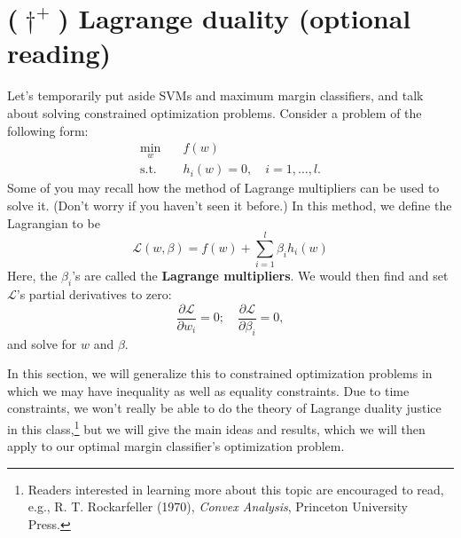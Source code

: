 \section{($\dagger^+$) Lagrange duality (optional reading)}
Let's temporarily put aside SVMs and maximum margin classifiers, and talk
about solving constrained optimization problems.
Consider a problem of the following form:
\begin{align*} %
    \min_w \quad& f(w)\\
    \operatorname{s.t.} \quad& h_i (w) = 0, \quad i = 1,\ldots,l.    
\end{align*}
Some of you may recall how the method of Lagrange multipliers can be used
to solve it. (Don't worry if you haven't seen it before.) In this method, we
define the Lagrangian to be{}
\begin{equation*}
    \mathcal L(w,\beta) = f(w) + \sum_{i=1}^l \beta_i h_i (w)
\end{equation*}
Here, the $\beta_i$'s are called the \textbf{Lagrange multipliers}. We would then find
and set $\mathcal{L}$'s partial derivatives to zero:
\begin{equation*}
    \frac{\partial \mathcal L}{\partial w_i} = 0; \quad \frac{\partial \mathcal L}{\partial \beta_i} = 0,    
\end{equation*}
and solve for $w$ and $\beta$.

In this section, we will generalize this to constrained optimization problems
in which we may have inequality as well as equality constraints. Due to
time constraints, we won't really be able to do the theory of Lagrange duality
justice in this class,\footnote{%
Readers interested in learning more about this topic are encouraged to read, e.g., R.
T. Rockarfeller (1970), \textit{Convex Analysis}, Princeton University Press.
} but we will give the main ideas and results, which we
will then apply to our optimal margin classifier's optimization problem.

